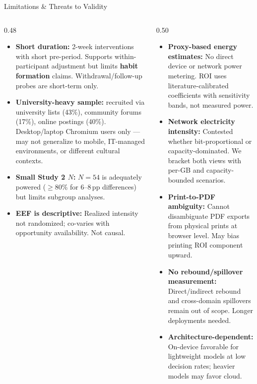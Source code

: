 \documentclass[10pt,aspectratio=169]{beamer}
\newcommand{\emphmark}[1]{\textcolor{chiAccent}{\textbf{#1}}}
\begin{document}
\begin{frame}{Limitations \& Threats to Validity}
\begin{columns}[T]
\begin{column}{0.48\textwidth}
\begin{alertbox}
\scriptsize
\begin{itemize}\setlength\itemsep{3pt}
  \item \textbf{Short duration:} 2-week interventions with short pre-period. Supports within-participant adjustment but limits \emphmark{habit formation} claims. Withdrawal/follow-up probes are short-term only.
  \item \textbf{University-heavy sample:} recruited via university lists (43\%), community forums (17\%), online postings (40\%). Desktop/laptop Chromium users only --- may not generalize to mobile, IT-managed environments, or different cultural contexts.
  \item \textbf{Small Study 2 $N$:} $N{=}54$ is adequately powered ($\ge$80\% for 6--8\,pp differences) but limits subgroup analyses.
  \item \textbf{EEF is descriptive:} Realized intensity not randomized; co-varies with opportunity availability. Not causal.
\end{itemize}
\end{alertbox}
\end{column}
\begin{column}{0.50\textwidth}
\begin{alertbox}
\scriptsize
\begin{itemize}\setlength\itemsep{3pt}
  \item \textbf{Proxy-based energy estimates:} No direct device or network power metering. ROI uses literature-calibrated coefficients with sensitivity bands, not measured power.
  \item \textbf{Network electricity intensity:} Contested whether bit-proportional or capacity-dominated. We bracket both views with per-GB and capacity-bounded scenarios.
  \item \textbf{Print-to-PDF ambiguity:} Cannot disambiguate PDF exports from physical prints at browser level. May bias printing ROI component upward.
  \item \textbf{No rebound/spillover measurement:} Direct/indirect rebound and cross-domain spillovers remain out of scope. Longer deployments needed.
  \item \textbf{Architecture-dependent:} On-device favorable for lightweight models at low decision rates; heavier models may favor cloud.
\end{itemize}
\end{alertbox}
\end{column}
\end{columns}
\end{frame}
\end{document}
